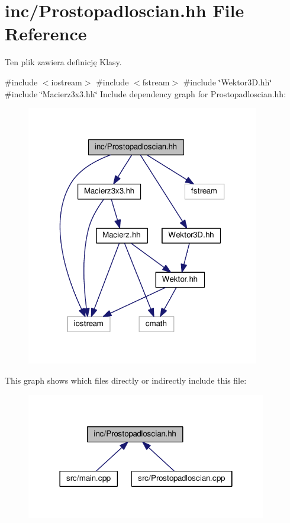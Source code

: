 \hypertarget{Prostopadloscian_8hh}{}\section{inc/\+Prostopadloscian.hh File Reference}
\label{Prostopadloscian_8hh}


Ten plik zawiera definicję Klasy.  


{\ttfamily \#include $<$iostream$>$}\newline
{\ttfamily \#include $<$fstream$>$}\newline
{\ttfamily \#include \char`\"{}Wektor3\+D.\+hh\char`\"{}}\newline
{\ttfamily \#include \char`\"{}Macierz3x3.\+hh\char`\"{}}\newline
Include dependency graph for Prostopadloscian.\+hh\+:\nopagebreak
\begin{figure}[H]
\begin{center}
\leavevmode
\includegraphics[width=289pt]{Prostopadloscian_8hh__incl}
\end{center}
\end{figure}
This graph shows which files directly or indirectly include this file\+:\nopagebreak
\begin{figure}[H]
\begin{center}
\leavevmode
\includegraphics[width=298pt]{Prostopadloscian_8hh__dep__incl}
\end{center}
\end{figure}
